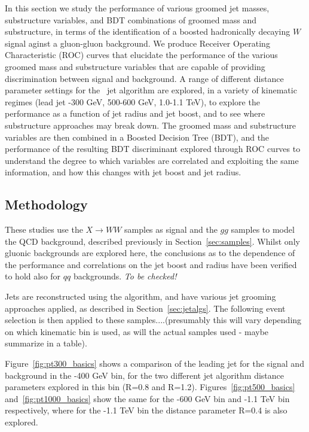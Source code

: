 In this section we study the performance of various groomed jet
masses, substructure variables, and BDT combinations of groomed mass
and substructure, in terms of the
identification of a boosted hadronically decaying $W$ signal aginst a gluon-gluon
background. We produce Receiver Operating Characteristic (ROC)
curves that elucidate the performance of the various groomed mass and
substructure variables that are
capable of providing discrimination between signal and background. A
range of different distance parameter settings for the \antikt~jet
algorithm are explored, in a variety of kinematic regimes
(lead jet -300 GeV, 500-600 GeV, 1.0-1.1 TeV), to explore the
performance as a function of jet radius and jet boost, and to see
where substructure approaches may break down. The groomed
mass and substructure variables are then combined in a Boosted Decision Tree (BDT), and the performance of the resulting BDT discriminant
explored through ROC curves to understand the degree to which
variables are correlated and exploiting the same information, and how
this changes with jet boost and jet radius. 

\subsection{Methodology}

These studies use the $X \rightarrow WW$ samples as signal and the $gg$
samples to model the QCD background, described previously in Section~\ref{sec:samples}. Whilst only gluonic backgrounds
are explored here, the conclusions as to the dependence of the
performance and correlations on the jet boost and radius have been
verified to hold also for $qq$ backgrounds. {\it To be checked!}

Jets are reconstructed using the \antikt algorithm, and have various
jet grooming approaches applied, as described in Section~\ref{sec:jetalgs}. The following event selection is then applied to these
samples....(presumably this will vary depending on which kinematic bin
is used, as will the actual samples used - maybe summarize in a table).

Figure~\ref{fig:pt300_basics} shows a comparison of the
leading jet \pt for the signal and background in the -400 GeV bin, for the two different \antikt jet
algorithm distance parameters explored in this bin (R=0.8 and R=1.2). Figures~\ref{fig:pt500_basics} and~\ref{fig:pt1000_basics}  show the same for the
-600 GeV bin and -1.1 TeV bin respectively, where for
the -1.1 TeV bin the distance parameter R=0.4 is also explored.

